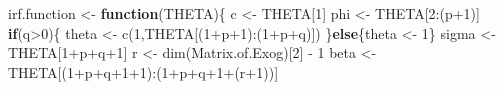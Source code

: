 \documentclass[
  12pt,
]{book}
\newenvironment{Shaded}{\begin{snugshade}}{\end{snugshade}}
\newcommand{\ControlFlowTok}[1]{\textcolor[rgb]{0.13,0.29,0.53}{\textbf{#1}}}
\newcommand{\DecValTok}[1]{\textcolor[rgb]{0.00,0.00,0.81}{#1}}
\newcommand{\FunctionTok}[1]{\textcolor[rgb]{0.00,0.00,0.00}{#1}}
\newcommand{\NormalTok}[1]{#1}
\newcommand{\OtherTok}[1]{\textcolor[rgb]{0.56,0.35,0.01}{#1}}
\newcommand{\SpecialCharTok}[1]{\textcolor[rgb]{0.00,0.00,0.00}{#1}}
\theoremstyle{definition}
\theoremstyle{definition}
\theoremstyle{definition}
\theoremstyle{definition}
\theoremstyle{remark}
\begin{document}
\begin{Shaded}
\begin{Highlighting}[]
\NormalTok{irf.function }\OtherTok{\textless{}{-}} \ControlFlowTok{function}\NormalTok{(THETA)\{}
\NormalTok{  c }\OtherTok{\textless{}{-}}\NormalTok{ THETA[}\DecValTok{1}\NormalTok{]}
\NormalTok{  phi }\OtherTok{\textless{}{-}}\NormalTok{ THETA[}\DecValTok{2}\SpecialCharTok{:}\NormalTok{(p}\SpecialCharTok{+}\DecValTok{1}\NormalTok{)]}
  \ControlFlowTok{if}\NormalTok{(q}\SpecialCharTok{\textgreater{}}\DecValTok{0}\NormalTok{)\{}
\NormalTok{    theta }\OtherTok{\textless{}{-}} \FunctionTok{c}\NormalTok{(}\DecValTok{1}\NormalTok{,THETA[(}\DecValTok{1}\SpecialCharTok{+}\NormalTok{p}\SpecialCharTok{+}\DecValTok{1}\NormalTok{)}\SpecialCharTok{:}\NormalTok{(}\DecValTok{1}\SpecialCharTok{+}\NormalTok{p}\SpecialCharTok{+}\NormalTok{q)])}
\NormalTok{  \}}\ControlFlowTok{else}\NormalTok{\{theta }\OtherTok{\textless{}{-}} \DecValTok{1}\NormalTok{\}}
\NormalTok{  sigma }\OtherTok{\textless{}{-}}\NormalTok{ THETA[}\DecValTok{1}\SpecialCharTok{+}\NormalTok{p}\SpecialCharTok{+}\NormalTok{q}\SpecialCharTok{+}\DecValTok{1}\NormalTok{]}
\NormalTok{  r }\OtherTok{\textless{}{-}} \FunctionTok{dim}\NormalTok{(Matrix.of.Exog)[}\DecValTok{2}\NormalTok{] }\SpecialCharTok{{-}} \DecValTok{1}
\NormalTok{  beta }\OtherTok{\textless{}{-}}\NormalTok{ THETA[(}\DecValTok{1}\SpecialCharTok{+}\NormalTok{p}\SpecialCharTok{+}\NormalTok{q}\SpecialCharTok{+}\DecValTok{1}\SpecialCharTok{+}\DecValTok{1}\NormalTok{)}\SpecialCharTok{:}\NormalTok{(}\DecValTok{1}\SpecialCharTok{+}\NormalTok{p}\SpecialCharTok{+}\NormalTok{q}\SpecialCharTok{+}\DecValTok{1}\SpecialCharTok{+}\NormalTok{(r}\SpecialCharTok{+}\DecValTok{1}\NormalTok{))]}
  

\end{Highlighting}
\end{Shaded}
\end{document}
